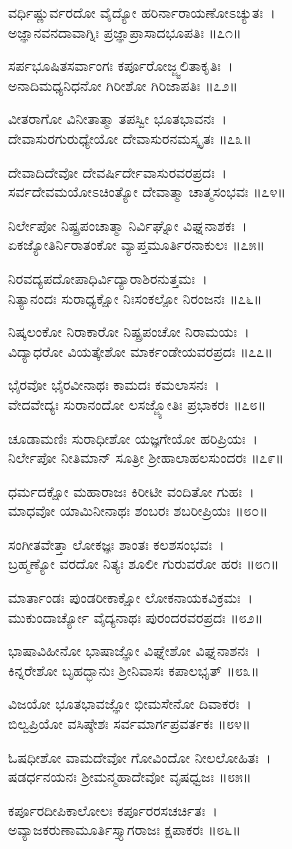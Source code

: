 	ವರ್ಧಿಷ್ಣುರ್ವರದೋ ವೈದ್ಯೋ ಹರಿರ್ನಾರಾಯಣೋಽಚ್ಯುತಃ~।\\
	ಅಜ್ಞಾನವನದಾವಾಗ್ನಿಃ ಪ್ರಜ್ಞಾಪ್ರಾಸಾದಭೂಪತಿಃ ॥೭೧॥

ಸರ್ಪಭೂಷಿತಸರ್ವಾಂಗಃ ಕರ್ಪೂರೋಜ್ಜ್ವಲಿತಾಕೃತಿಃ~।\\
ಅನಾದಿಮಧ್ಯನಿಧನೋ ಗಿರೀಶೋ ಗಿರಿಜಾಪತಿಃ ॥೭೨॥

	ವೀತರಾಗೋ ವಿನೀತಾತ್ಮಾ ತಪಸ್ವೀ ಭೂತಭಾವನಃ~।\\
	ದೇವಾಸುರಗುರುಧ್ಯೇಯೋ ದೇವಾಸುರನಮಸ್ಕೃತಃ ॥೭೩॥

ದೇವಾದಿದೇವೋ ದೇವರ್ಷಿರ್ದೇವಾಸುರವರಪ್ರದಃ~।\\
ಸರ್ವದೇವಮಯೋಽಚಿಂತ್ಯೋ ದೇವಾತ್ಮಾ ಚಾತ್ಮಸಂಭವಃ ॥೭೪॥

	ನಿರ್ಲೇಪೋ ನಿಷ್ಪ್ರಪಂಚಾತ್ಮಾ ನಿರ್ವಿಘ್ನೋ ವಿಘ್ನನಾಶಕಃ~।\\
	ಏಕಜ್ಯೋತಿರ್ನಿರಾತಂಕೋ ವ್ಯಾಪ್ತಮೂರ್ತಿರನಾಕುಲಃ ॥೭೫॥

ನಿರವದ್ಯಪದೋಪಾಧಿರ್ವಿದ್ಯಾರಾಶಿರನುತ್ತಮಃ~।\\
ನಿತ್ಯಾನಂದಃ ಸುರಾಧ್ಯಕ್ಷೋ ನಿಃಸಂಕಲ್ಪೋ ನಿರಂಜನಃ ॥೭೬॥

	ನಿಷ್ಕಲಂಕೋ ನಿರಾಕಾರೋ ನಿಷ್ಪ್ರಪಂಚೋ ನಿರಾಮಯಃ~।\\
	ವಿದ್ಯಾಧರೋ ವಿಯತ್ಕೇಶೋ ಮಾರ್ಕಂಡೇಯವರಪ್ರದಃ ॥೭೭॥

ಭೈರವೋ ಭೈರವೀನಾಥಃ ಕಾಮದಃ ಕಮಲಾಸನಃ~।\\
ವೇದವೇದ್ಯಃ ಸುರಾನಂದೋ ಲಸಜ್ಜ್ಯೋತಿಃ ಪ್ರಭಾಕರಃ ॥೭೮॥

	ಚೂಡಾಮಣಿಃ ಸುರಾಧೀಶೋ ಯಜ್ಞಗೇಯೋ ಹರಿಪ್ರಿಯಃ~।\\
	ನಿರ್ಲೇಪೋ ನೀತಿಮಾನ್ ಸೂತ್ರೀ ಶ್ರೀಹಾಲಾಹಲಸುಂದರಃ ॥೭೯॥

ಧರ್ಮದಕ್ಷೋ ಮಹಾರಾಜಃ ಕಿರೀಟೀ ವಂದಿತೋ ಗುಹಃ~।\\
ಮಾಧವೋ ಯಾಮಿನೀನಾಥಃ ಶಂಬರಃ ಶಬರೀಪ್ರಿಯಃ ॥೮೦॥

	ಸಂಗೀತವೇತ್ತಾ ಲೋಕಜ್ಞಃ ಶಾಂತಃ ಕಲಶಸಂಭವಃ~।\\
	ಬ್ರಹ್ಮಣ್ಯೋ ವರದೋ ನಿತ್ಯಃ ಶೂಲೀ ಗುರುವರೋ ಹರಃ ॥೮೧॥

ಮಾರ್ತಾಂಡಃ ಪುಂಡರೀಕಾಕ್ಷೋ ಲೋಕನಾಯಕವಿಕ್ರಮಃ~।\\
ಮುಕುಂದಾರ್ಚ್ಯೋ ವೈದ್ಯನಾಥಃ ಪುರಂದರವರಪ್ರದಃ ॥೮೨॥

	ಭಾಷಾವಿಹೀನೋ ಭಾಷಾಜ್ಞೋ ವಿಘ್ನೇಶೋ ವಿಘ್ನನಾಶನಃ~।\\
	ಕಿನ್ನರೇಶೋ ಬೃಹದ್ಭಾನುಃ ಶ್ರೀನಿವಾಸಃ ಕಪಾಲಭೃತ್ ॥೮೩॥

ವಿಜಯೋ ಭೂತಭಾವಜ್ಞೋ ಭೀಮಸೇನೋ ದಿವಾಕರಃ~।\\
ಬಿಲ್ವಪ್ರಿಯೋ ವಸಿಷ್ಠೇಶಃ ಸರ್ವಮಾರ್ಗಪ್ರವರ್ತಕಃ ॥೮೪॥

	ಓಷಧೀಶೋ ವಾಮದೇವೋ ಗೋವಿಂದೋ ನೀಲಲೋಹಿತಃ~।\\
	ಷಡರ್ಧನಯನಃ ಶ್ರೀಮನ್ಮಹಾದೇವೋ ವೃಷಧ್ವಜಃ ॥೮೫॥

ಕರ್ಪೂರದೀಪಿಕಾಲೋಲಃ ಕರ್ಪೂರರಸಚರ್ಚಿತಃ~।\\
ಅವ್ಯಾಜಕರುಣಾಮೂರ್ತಿಸ್ತ್ಯಾಗರಾಜಃ ಕ್ಷಪಾಕರಃ ॥೮೬॥

